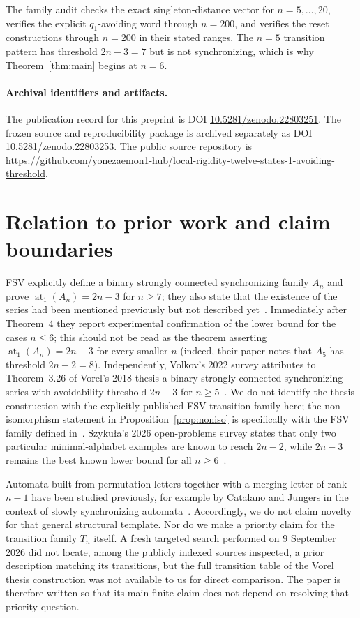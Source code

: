 \documentclass[11pt]{article}
\theoremstyle{definition}
\theoremstyle{remark}
\begin{document}
The family audit checks the exact singleton-distance vector for $n=5,\ldots,20$, verifies the explicit $q_1$-avoiding word through $n=200$, and verifies the reset constructions through $n=200$ in their stated ranges. The $n=5$ transition pattern has threshold $2n-3=7$ but is not synchronizing, which is why Theorem~\ref{thm:main} begins at $n=6$.

\paragraph{Archival identifiers and artifacts.} The publication record for this preprint is DOI \href{https://doi.org/10.5281/zenodo.22803251}{10.5281/zenodo.22803251}. The frozen source and reproducibility package is archived separately as DOI \href{https://doi.org/10.5281/zenodo.22803253}{10.5281/zenodo.22803253}. The public source repository is \url{https://github.com/yonezaemon1-hub/local-rigidity-twelve-states-1-avoiding-threshold}.

\section{Relation to prior work and claim boundaries}
FSV explicitly define a binary strongly connected synchronizing family $A_n$ and prove $\operatorname{at}_1(A_n)=2n-3$ for $n\ge7$; they also state that the existence of the series had been mentioned previously but not described yet~\cite{FSV2021}. Immediately after Theorem~4 they report experimental confirmation of the lower bound for the cases $n\le6$; this should not be read as the theorem asserting $\operatorname{at}_1(A_n)=2n-3$ for every smaller $n$ (indeed, their paper notes that $A_5$ has threshold $2n-2=8$). Independently, Volkov's 2022 survey attributes to Theorem~3.26 of Vorel's 2018 thesis a binary strongly connected synchronizing series with avoidability threshold $2n-3$ for $n\ge5$~\cite{Volkov2022,Vorel2018}. We do not identify the thesis construction with the explicitly published FSV transition family here; the non-isomorphism statement in Proposition~\ref{prop:noniso} is specifically with the FSV family defined in~\cite{FSV2021}. Szyku\l a's 2026 open-problems survey states that only two particular minimal-alphabet examples are known to reach $2n-2$, while $2n-3$ remains the best known lower bound for all $n\ge6$~\cite{Szykula2026}.

Automata built from permutation letters together with a merging letter of rank $n-1$ have been studied previously, for example by Catalano and Jungers in the context of slowly synchronizing automata~\cite{CatalanoJungers2018}. Accordingly, we do not claim novelty for that general structural template. Nor do we make a priority claim for the transition family $T_n$ itself. A fresh targeted search performed on 9 September 2026 did not locate, among the publicly indexed sources inspected, a prior description matching its transitions, but the full transition table of the Vorel thesis construction was not available to us for direct comparison. The paper is therefore written so that its main finite claim does not depend on resolving that priority question.
\end{document}
